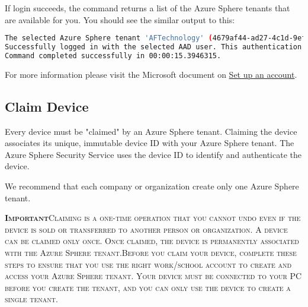 If login succeeds, the command returns a list of the Azure Sphere tenants that are available for you. You should see the similar output to this:
\begin{lstlisting}[language=bash]
    The selected Azure Sphere tenant 'AFTechnology' (4679af44-ad27-4c1d-9ef8-4f76b540edae) will be retained.
Successfully logged in with the selected AAD user. This authentication will be used for subsequent commands.
Command completed successfully in 00:00:15.3946315.
\end{lstlisting}

For more information please visit the Microsoft document on \hyperlink{https://docs.microsoft.com/en-us/azure-sphere/install/azure-directory-account}{Set up an account}.

\subsection{Claim Device}
Every device must be "claimed" by an Azure Sphere tenant. Claiming the device associates its unique, immutable device ID with your Azure Sphere tenant. The Azure Sphere Security Service uses the device ID to identify and authenticate the device.

We recommend that each company or organization create only one Azure Sphere tenant.

\begin{tcolorbox}
\textsc{\textbf{Important}\newline\newline Claiming is a one-time operation that you cannot undo even if the device is sold or transferred to another person or organization. A device can be claimed only once. Once claimed, the device is permanently associated with the Azure Sphere tenant.\newline\newline Before you claim your device, complete these steps to ensure that you use the right work/school account to create and access your Azure Sphere tenant. Your device must be connected to your PC before you create the tenant, and you can only use the device to create a single tenant.}
\end{tcolorbox}

